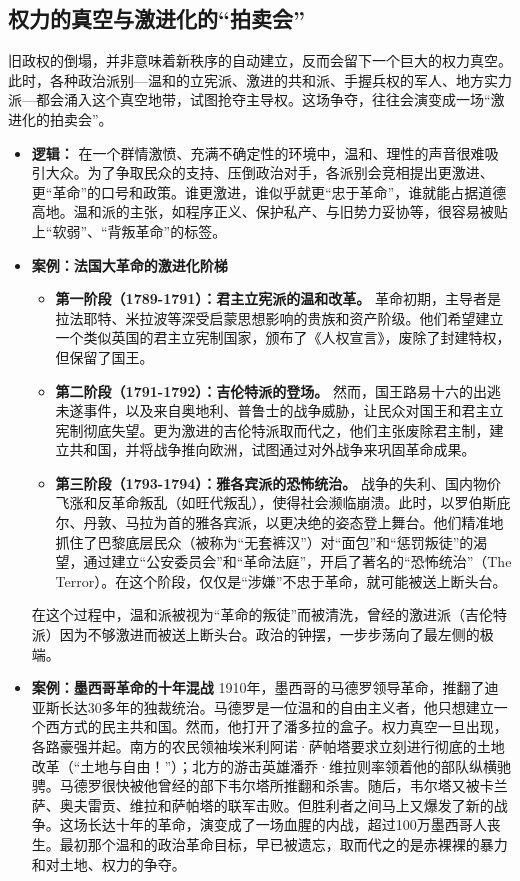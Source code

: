 \subsection{ 权力的真空与激进化的“拍卖会”}

旧政权的倒塌，并非意味着新秩序的自动建立，反而会留下一个巨大的权力真空。此时，各种政治派别---温和的立宪派、激进的共和派、手握兵权的军人、地方实力派---都会涌入这个真空地带，试图抢夺主导权。这场争夺，往往会演变成一场“激进化的拍卖会”。
\begin{itemize}
\item \textbf{逻辑：} 在一个群情激愤、充满不确定性的环境中，温和、理性的声音很难吸引大众。为了争取民众的支持、压倒政治对手，各派别会竞相提出更激进、更“革命”的口号和政策。谁更激进，谁似乎就更“忠于革命”，谁就能占据道德高地。温和派的主张，如程序正义、保护私产、与旧势力妥协等，很容易被贴上“软弱”、“背叛革命”的标签。
\item \textbf{案例：法国大革命的激进化阶梯}
    \begin{itemize}
    \item \textbf{第一阶段（1789-1791）：君主立宪派的温和改革。} 革命初期，主导者是拉法耶特、米拉波等深受启蒙思想影响的贵族和资产阶级。他们希望建立一个类似英国的君主立宪制国家，颁布了《人权宣言》，废除了封建特权，但保留了国王。
    \item \textbf{第二阶段（1791-1792）：吉伦特派的登场。} 然而，国王路易十六的出逃未遂事件，以及来自奥地利、普鲁士的战争威胁，让民众对国王和君主立宪制彻底失望。更为激进的吉伦特派取而代之，他们主张废除君主制，建立共和国，并将战争推向欧洲，试图通过对外战争来巩固革命成果。
    \item \textbf{第三阶段（1793-1794）：雅各宾派的恐怖统治。} 战争的失利、国内物价飞涨和反革命叛乱（如旺代叛乱），使得社会濒临崩溃。此时，以罗伯斯庇尔、丹敦、马拉为首的雅各宾派，以更决绝的姿态登上舞台。他们精准地抓住了巴黎底层民众（被称为“无套裤汉”）对“面包”和“惩罚叛徒”的渴望，通过建立“公安委员会”和“革命法庭”，开启了著名的“恐怖统治”（The Terror）。在这个阶段，仅仅是“涉嫌”不忠于革命，就可能被送上断头台。
    \end{itemize}
    在这个过程中，温和派被视为“革命的叛徒”而被清洗，曾经的激进派（吉伦特派）因为不够激进而被送上断头台。政治的钟摆，一步步荡向了最左侧的极端。
\item \textbf{案例：墨西哥革命的十年混战}
    1910年，墨西哥的马德罗领导革命，推翻了迪亚斯长达30多年的独裁统治。马德罗是一位温和的自由主义者，他只想建立一个西方式的民主共和国。然而，他打开了潘多拉的盒子。权力真空一旦出现，各路豪强并起。南方的农民领袖埃米利阿诺·萨帕塔要求立刻进行彻底的土地改革（“土地与自由！”）；北方的游击英雄潘乔·维拉则率领着他的部队纵横驰骋。马德罗很快被他曾经的部下韦尔塔所推翻和杀害。随后，韦尔塔又被卡兰萨、奥夫雷贡、维拉和萨帕塔的联军击败。但胜利者之间马上又爆发了新的战争。这场长达十年的革命，演变成了一场血腥的内战，超过100万墨西哥人丧生。最初那个温和的政治革命目标，早已被遗忘，取而代之的是赤裸裸的暴力和对土地、权力的争夺。
\end{itemize}

